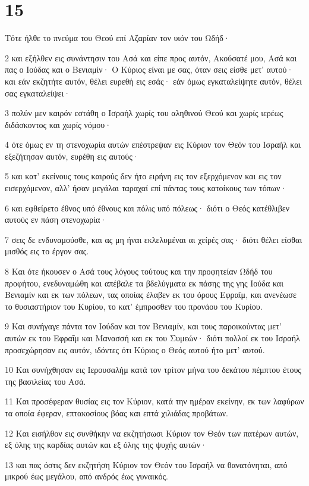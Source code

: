 \chapter{15}

\par Τότε ήλθε το πνεύμα του Θεού επί Αζαρίαν τον υιόν του Ωδήδ·
\par 2 και εξήλθεν εις συνάντησιν του Ασά και είπε προς αυτόν, Ακούσατέ μου, Ασά και πας ο Ιούδας και ο Βενιαμίν· Ο Κύριος είναι με σας, όταν σεις είσθε μετ' αυτού· και εάν εκζητήτε αυτόν, θέλει ευρεθή εις εσάς· εάν όμως εγκαταλείψητε αυτόν, θέλει σας εγκαταλείψει·
\par 3 πολύν μεν καιρόν εστάθη ο Ισραήλ χωρίς του αληθινού Θεού και χωρίς ιερέως διδάσκοντος και χωρίς νόμου·
\par 4 ότε όμως εν τη στενοχωρία αυτών επέστρεψαν εις Κύριον τον Θεόν του Ισραήλ και εξεζήτησαν αυτόν, ευρέθη εις αυτούς·
\par 5 και κατ' εκείνους τους καιρούς δεν ήτο ειρήνη εις τον εξερχόμενον και εις τον εισερχόμενον, αλλ' ήσαν μεγάλαι ταραχαί επί πάντας τους κατοίκους των τόπων·
\par 6 και εφθείρετο έθνος υπό έθνους και πόλις υπό πόλεως· διότι ο Θεός κατέθλιβεν αυτούς εν πάση στενοχωρία·
\par 7 σεις δε ενδυναμούσθε, και ας μη ήναι εκλελυμέναι αι χείρές σας· διότι θέλει είσθαι μισθός εις το έργον σας.
\par 8 Και ότε ήκουσεν ο Ασά τους λόγους τούτους και την προφητείαν Ωδήδ του προφήτου, ενεδυναμώθη και απέβαλε τα βδελύγματα εκ πάσης της γης Ιούδα και Βενιαμίν και εκ των πόλεων, τας οποίας έλαβεν εκ του όρους Εφραΐμ, και ανενέωσε το θυσιαστήριον του Κυρίου, το κατ' έμπροσθεν του προνάου του Κυρίου.
\par 9 Και συνήγαγε πάντα τον Ιούδαν και τον Βενιαμίν, και τους παροικούντας μετ' αυτών εκ του Εφραΐμ και Μανασσή και εκ του Συμεών· διότι πολλοί εκ του Ισραήλ προσεχώρησαν εις αυτόν, ιδόντες ότι Κύριος ο Θεός αυτού ήτο μετ' αυτού.
\par 10 Και συνήχθησαν εις Ιερουσαλήμ κατά τον τρίτον μήνα του δεκάτου πέμπτου έτους της βασιλείας του Ασά.
\par 11 Και προσέφεραν θυσίας εις τον Κύριον, κατά την ημέραν εκείνην, εκ των λαφύρων τα οποία έφεραν, επτακοσίους βόας και επτά χιλιάδας προβάτων.
\par 12 Και εισήλθον εις συνθήκην να εκζητήσωσι Κύριον τον Θεόν των πατέρων αυτών, εξ όλης της καρδίας αυτών και εξ όλης της ψυχής αυτών·
\par 13 και πας όστις δεν εκζητήση Κύριον τον Θεόν του Ισραήλ να θανατόνηται, από μικρού έως μεγάλου, από ανδρός έως γυναικός.
